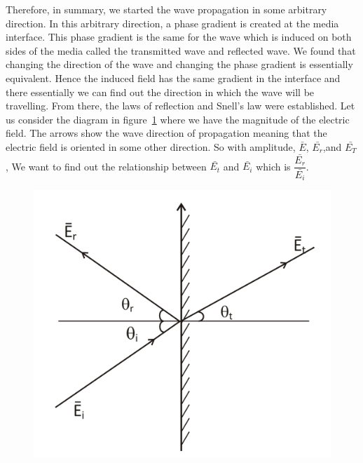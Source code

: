 Therefore, in summary, we started the wave propagation in some arbitrary direction. In this arbitrary direction, a phase gradient is created at the media interface. This phase gradient is the same for the wave which is induced on both sides of the media called the transmitted wave and reflected wave. We found that changing the direction of the wave and changing the phase gradient is essentially equivalent. Hence the induced field has the same gradient in the interface and there essentially we can find out the direction in which the wave will be travelling. From there, the laws of reflection and Snell's law were established. Let us consider the diagram in figure~\ref{fig:group30f} where we have the magnitude of the electric field. The arrows show the wave direction of propagation meaning that the electric field is oriented in some other direction. So with amplitude, $\bar{E}$, $\bar{E_r}$,and $\bar{E_T}$, We want to find out the relationship between $\bar{E_t}$ and $\bar{E_i}$ which is $\dfrac{\bar{E_r}}{\bar{E_i}}$.
\begin{figure}[h]
\centering
\includegraphics[width=.7\linewidth]{./graphics/group30f}
\caption{}
\label{fig:group30f}
\end{figure}

